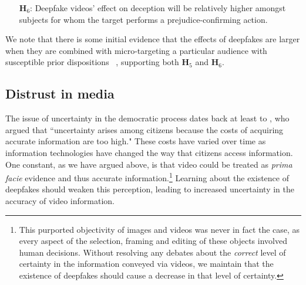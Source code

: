 \documentclass[12pt,letterpaper]{article}
\begin{document}

\begin{itemize}
    \item[\textbf{H$_{6}$}:] Deepfake videos' effect on deception will be relatively higher amongst subjects for whom the target performs a prejudice-confirming action.
\end{itemize}

We note that there is some initial evidence that the effects of deepfakes are larger when they are combined with micro-targeting a particular audience with susceptible prior dispositions ~\citep{dobber2020microtargeted}, supporting both \textbf{H$_5$} and \textbf{H$_6$}. 

\subsection{Distrust in media}



The issue of uncertainty in the democratic process dates back at least to \cite{downs1957economic}, who argued that ``uncertainty arises among citizens because the costs of acquiring accurate information are too high." These costs have varied over time as information technologies have changed the way that citizens access information. One constant, as we have argued above, is that video could be treated as \textit{prima facie} evidence and thus accurate information.\footnote{This purported objectivity of images and videos was never in fact the case, as every aspect of the selection, framing and editing of these objects involved human decisions. Without resolving any debates about the \textit{correct} level of certainty in the information conveyed via videos, we maintain that the existence of deepfakes should cause a decrease in that level of certainty. } Learning about the existence of deepfakes should weaken this perception, leading to increased uncertainty in the accuracy of video information. 
\end{document}
